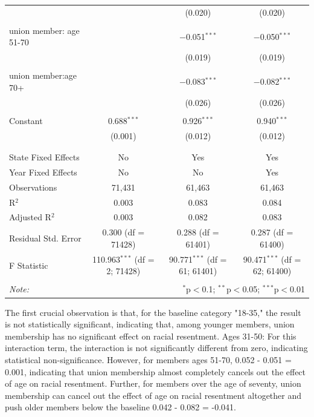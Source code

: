 \documentclass[12pt,letterpaper]{article}
\begin{document}
\begin{table}[H]
{\begin{tabular}{@{\extracolsep{5pt}}lccc}
		&  & (0.020) & (0.020) \\ 
		& & & \\ 
		union member: age 51-70 &  & $-$0.051$^{***}$ & $-$0.050$^{***}$ \\ 
		&  & (0.019) & (0.019) \\ 
		& & & \\ 
		union member:age 70+ &  & $-$0.083$^{***}$ & $-$0.082$^{***}$ \\ 
		&  & (0.026) & (0.026) \\ 
		& & & \\ 
		Constant & 0.688$^{***}$ & 0.926$^{***}$ & 0.940$^{***}$ \\ 
		& (0.001) & (0.012) & (0.012) \\ 
		& & & \\ 
		\hline \\[-1.8ex] 
		State Fixed Effects & No & Yes & Yes \\ 
		Year Fixed Effects & No & No & Yes \\ 
		Observations & 71,431 & 61,463 & 61,463 \\ 
		R$^{2}$ & 0.003 & 0.083 & 0.084 \\ 
		Adjusted R$^{2}$ & 0.003 & 0.082 & 0.083 \\ 
		Residual Std. Error & 0.300 (df = 71428) & 0.288 (df = 61401) & 0.287 (df = 61400) \\ 
		F Statistic & 110.963$^{***}$ (df = 2; 71428) & 90.771$^{***}$ (df = 61; 61401) & 90.471$^{***}$ (df = 62; 61400) \\ 
		\hline 
		\hline \\[-1.8ex] 
		\textit{Note:}  & \multicolumn{3}{r}{$^{*}$p$<$0.1; $^{**}$p$<$0.05; $^{***}$p$<$0.01} \\ 
	\end{tabular} 
}
\end{table}

The first crucial observation is that, for the baseline category "18-35," the result is not statistically significant, indicating that, among younger members, union membership has no significant effect on racial resentment. 
Ages 31-50: For this interaction term, the interaction is not significantly different from zero, indicating statistical non-significance. However, for members ages 51-70, 0.052 - 0.051 = 0.001, indicating that union membership almost completely cancels out the effect of age on racial resentment. Further, for members over the age of seventy, union membership can cancel out the effect of age on racial resentment altogether and push older members below the baseline 0.042 - 0.082 = -0.041.
\end{document}
